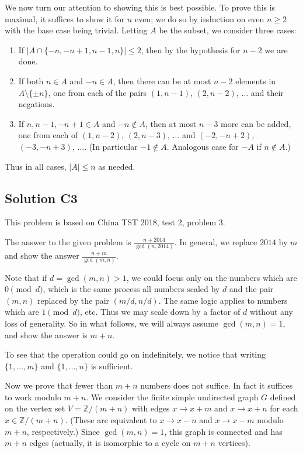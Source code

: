 \documentclass[11pt]{scrartcl}
\providecommand{\ZZ}{\mathbb Z}
\begin{document}
We now turn our attention to showing this is best possible.
To prove this is maximal, it suffices to show it for $n$ even;
we do so by induction on even $n \ge 2$ with the base case being trivial.
Letting $A$ be the subset, we consider three cases:
\begin{enumerate}
	\item If $|A \cap \{-n,-n+1,n-1,n\}| \le 2$,
	then by the hypothesis for $n-2$ we are done.
	\item If both $n \in A$ and $-n \in A$,
	then there can be at most $n-2$ elements in $A \setminus \{\pm n\}$,
	one from each of the pairs $(1,n-1)$, $(2,n-2)$, $\dots$
	and their negations.
	\item If $n, n-1, -n+1 \in A$ and $-n \notin A$,
	then at most $n-3$ more can be added,
	one from each of $(1, n-2)$, $(2, n-3)$, $\dots$
	and $(-2, -n+2)$, $(-3, -n+3)$, $\dots$.
	(In particular $-1 \notin A$.
	Analogous case for $-A$ if $n \notin A$.)
\end{enumerate}
Thus in all cases, $|A| \le n$ as needed.

\subsection*{Solution C3}
This problem is based on China TST 2018, test 2, problem 3.

The answer to the given problem is $\frac{n+2014}{\gcd(n,2014)}$.
In general, we replace $2014$ by $m$ and show the answer
$\frac{n+m}{\gcd(m,n)}$.

Note that if $d = \gcd(m,n) > 1$, we could focus only on
the numbers which are $0 \pmod d$, which is the same process
all numbers scaled by $d$ and the pair $(m,n)$ replaced by the pair $(m/d, n/d)$.
The same logic applies to numbers which are $1 \pmod d$, etc.
Thus we may scale down by a factor of $d$ without any loss of generality.
So in what follows, we will always assume $\gcd(m,n) = 1$,
and show the answer is $m+n$.

To see that the operation could go on indefinitely,
we notice that writing $\{1, \dots, m\}$ and $\{1, \dots, n\}$ is sufficient.

Now we prove that fewer than $m+n$ numbers does not suffice.
In fact it suffices to work modulo $m+n$.
We consider the finite simple undirected graph $G$
defined on the vertex set $V = \ZZ/(m+n)$ with edges
$x \to x+m$ and $x \to x+n$ for each $x \in \ZZ/(m+n)$.
(These are equivalent to $x \to x-n$
and $x \to x-m$ modulo $m+n$, respectively.)
Since $\gcd(m,n) = 1$, this graph is connected and has $m+n$ edges
(actually, it is isomorphic to a cycle on $m+n$ vertices).
\end{document}

